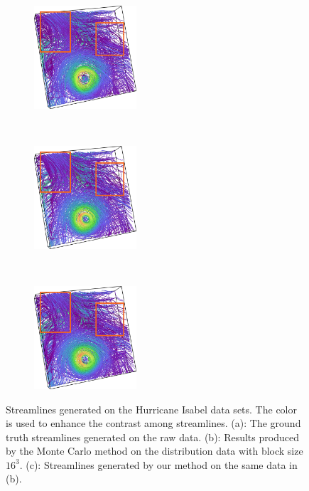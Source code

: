 \begin{figure}[!htbp]
  \centering
  \begin{subfigure}[!htbp]{0.32\textwidth}
    \centering
    \includegraphics[width=1.5in]{../figures/isabel_gt.eps}
    \caption{}
  \end{subfigure}~
  \begin{subfigure}[!htbp]{0.32\textwidth}
    \centering
    \includegraphics[width=1.5in]{../figures/isabel_mc.eps}
    \caption{}
  \end{subfigure}~
  \begin{subfigure}[!htbp]{0.32\textwidth}
    \centering
    \includegraphics[width=1.5in]{../figures/isabel_smc.eps}
    \caption{}
  \end{subfigure}

  \caption{Streamlines generated on the Hurricane Isabel data sets. The color is used to enhance the contrast among streamlines. (a): The ground truth streamlines generated on the raw data. (b): Results produced by the Monte Carlo method on the distribution data with block size $16^3$. (c): Streamlines generated by our method on the same data in (b).}
  \label{data_overview}
\end{figure}

